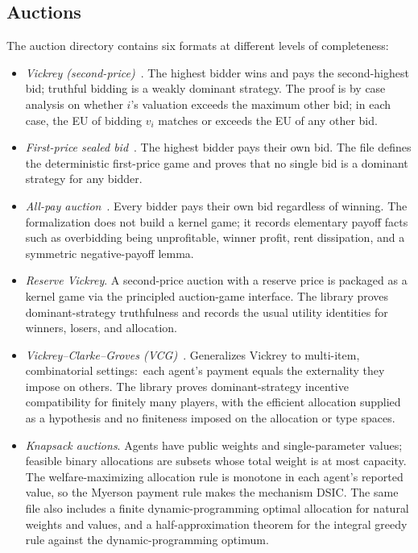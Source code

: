 \subsection{Auctions}
\label{sec:mech:auctions}

The auction directory contains six formats at different
levels of completeness:

\begin{itemize}\itemsep4pt
\item \emph{Vickrey (second-price)}~\citep{Vickrey1961}.  The
highest bidder wins and pays the second-highest bid; truthful
bidding is a weakly dominant strategy.  The proof is by case
analysis on whether $i$'s valuation exceeds the maximum other bid; in
each case, the EU of bidding $v_i$ matches or exceeds the EU of
any other bid.

\item \emph{First-price sealed bid}~\citep{Vickrey1961}.  The
highest bidder pays their own bid.  The file defines the
deterministic first-price game and proves that no single bid is a
dominant strategy for any bidder.

\item \emph{All-pay auction}~\citep{KrishnaMorgan1997}.  Every
bidder pays their own bid regardless of winning.  The
formalization does not build a kernel game; it records elementary
payoff facts such as overbidding being unprofitable, winner
profit, rent dissipation, and a symmetric negative-payoff lemma.

\item \emph{Reserve Vickrey}.  A second-price auction with a reserve
price is packaged as a kernel game via the principled auction-game
interface.  The library proves dominant-strategy truthfulness and
records the usual utility identities for winners, losers, and
allocation.

\item \emph{Vickrey–Clarke–Groves (VCG)}~\citep{Vickrey1961, Clarke1971,
Groves1973}.  Generalizes Vickrey to multi-item, combinatorial
settings:\ each agent's payment equals the externality they impose
on others.  The library proves dominant-strategy incentive
compatibility for finitely many players, with the efficient
allocation supplied as a hypothesis and no finiteness imposed on the
allocation or type spaces.

\item \emph{Knapsack auctions}.  Agents have public weights and
single-parameter values; feasible binary allocations are subsets whose
total weight is at most capacity.  The welfare-maximizing allocation
rule is monotone in each agent's reported value, so the Myerson
payment rule makes the mechanism DSIC.  The same file also includes a
finite dynamic-programming optimal allocation for natural weights and
values, and a half-approximation theorem for the integral greedy rule
against the dynamic-programming optimum.
\end{itemize}

